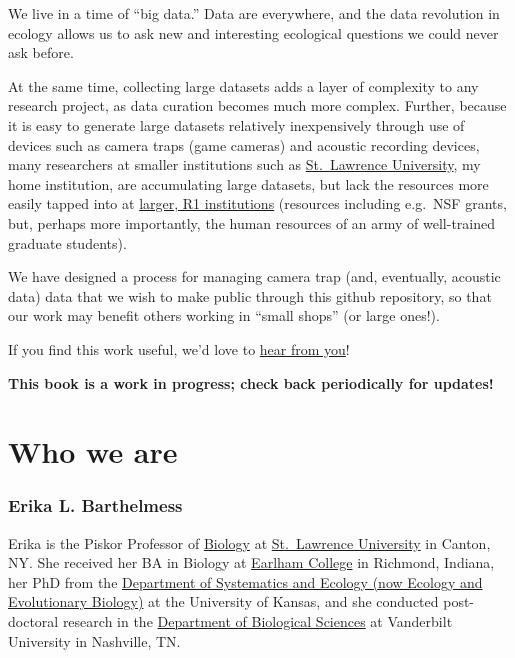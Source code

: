\documentclass[
  letterpaper,
  DIV=11,
  numbers=noendperiod]{scrreprt}
\begin{document}

We live in a time of ``big data.'' Data are everywhere, and the data
revolution in ecology allows us to ask new and interesting ecological
questions we could never ask before.

At the same time, collecting large datasets adds a layer of complexity
to any research project, as data curation becomes much more complex.
Further, because it is easy to generate large datasets relatively
inexpensively through use of devices such as camera traps (game cameras)
and acoustic recording devices, many researchers at smaller institutions
such as \href{https://www.stlawu.edu}{St.~Lawrence University}, my home
institution, are accumulating large datasets, but lack the resources
more easily tapped into at
\href{https://carnegieclassifications.acenet.edu/institutions/?inst=&research2025\%5B\%5D=1}{larger,
R1 institutions} (resources including e.g.~NSF grants, but, perhaps more
importantly, the human resources of an army of well-trained graduate
students).

We have designed a process for managing camera trap (and, eventually,
acoustic data) data that we wish to make public through this github
repository, so that our work may benefit others working in ``small
shops'' (or large ones!).

If you find this work useful, we'd love to
\href{mailto:barthelmess@stlawu.edu}{hear from you}!

\textbf{This book is a work in progress; check back periodically for
updates!}


\chapter*{Who we are}\label{who-we-are}


\subsection*{Erika L. Barthelmess}\label{erika-l.-barthelmess}

Erika is the Piskor Professor of
\href{https://www.stlawu.edu/offices/biology}{Biology} at
\href{https://www.stlawu.edu}{St.~Lawrence University} in Canton, NY.
She received her BA in Biology at \href{https://www.earlham.edu}{Earlham
College} in Richmond, Indiana, her PhD from the
\href{https://eeb.ku.edu/}{Department of Systematics and Ecology (now
Ecology and Evolutionary Biology)} at the University of Kansas, and she
conducted post-doctoral research in the
\href{https://as.vanderbilt.edu/biological-sciences/}{Department of
Biological Sciences} at Vanderbilt University in Nashville, TN.
\end{document}

